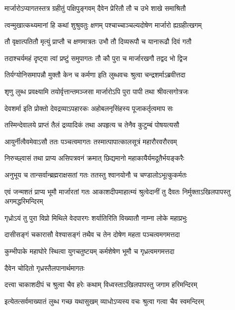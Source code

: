 \twolineshloka
{मार्जारोऽप्यागतस्तत्र ग्रहीतुं पक्षिपुङ्गवम्}
{दैवेन प्रेरितौ तौ च उभे शाखे समाश्रितौ} %

\twolineshloka
{त्वन्मुखात्कथ्यमानां हि कथां शुश्रुवतुः क्षणम्}
{पश्चाच्चाञ्चल्यदोषेण मार्जारो ह्यग्रहीत्खगम्} %

\twolineshloka
{तौ वृक्षात्पतितौ मृत्युं प्राप्तौ च क्षणमात्रतः}
{उभौ तौ दिव्यरूपौ च यानारूढौ दिवं गतौ} %

\twolineshloka
{तदाश्चर्यमहं दृष्ट्वा त्वां प्रष्टुं समुपागतः}
{तौ कौ पुरा च मार्जारखगौ तद्वद भो द्विज} %

\twolineshloka
{तिर्यग्योनिसमापन्नौ मुक्तौ केन च कर्मणा}
{इति लुब्धवचः श्रुत्वा चन्द्रशर्माऽब्रवीत्तदा} %

\twolineshloka
{शृणु लुब्ध प्रवक्ष्यामि तयोर्वृत्तान्तमञ्जसा}
{मार्जारोऽपि पुरा पापी तथा श्रीवत्सगोत्रजः} %

\twolineshloka
{देवशर्मा इति प्रोक्तो देवद्रव्याऽपहारकः}
{अहोबलनृसिंहस्य पूजाकर्तृत्वमाप सः} %

\twolineshloka
{तस्मिन्देवालये प्राप्तं तैलं द्रव्यादिकं तथा}
{अपहृत्य च तेनैव कुटुम्बं पोषयत्यसौ} %

\twolineshloka
{आयुर्नीत्वैवमेवाऽसौ ततः पञ्चत्वमागतः}
{तस्मात्पापात्कालसूत्रं महारौरवरौरवम्} %

\twolineshloka
{निरुच्छ्वासं तथा प्राप्य असिपत्रवनं क्रमात्}
{छिद्यमानो महाकायैर्यमदूतैर्भयङ्करैः} %

\twolineshloka
{अनुभूय च तान्सर्वान्ब्रह्मराक्षसतां गतः}
{ततस्तु श्वानयोनौ च चण्डालोऽभूत्कुकर्मतः} %

\threelineshloka
{एवं जन्मशतं प्राप्य भूमौ मार्जारतां गतः}
{आकाशदीपमाहात्म्यं श्रुत्वेदानीं तु दैवतः}
{निर्मुक्ताऽखिलपापस्तु अगमद्धरिमन्दिरम्} %

\twolineshloka
{गृध्रोऽयं तु पुरा विप्रो मिथिले वेदपारगः}
{शर्यातिरिति विख्यातौ नाम्ना लोके महाप्रभुः} %

\twolineshloka
{दासीसङ्गं चकारासौ वेश्यासङ्गं तथैव च}
{तेन दोषेण महता पञ्चत्वमगमत्तदा} %

\twolineshloka
{कुम्भीपाके महाघोरे स्थित्वा युगचतुष्टयम्}
{कर्मशेषेण भूमौ च गृध्रत्वमगमत्तदा} %


\onelineshloka
{दैवेन चोदितो गृध्रस्तैलपानार्थमागतः} %

\twolineshloka
{दत्त्वा चाकाशदीपं च श्रुत्वा चैव हरेः कथाम्}
{विध्वस्ताऽखिलपापस्तु जगाम हरिमन्दिरम्} %

\twolineshloka
{इत्येतत्सर्वमाख्यातं लुब्ध गच्छ यथासुखम्}
{व्याधोऽप्यस्य वचः श्रुत्वा गत्वा चैव स्वमन्दिरम्} %

